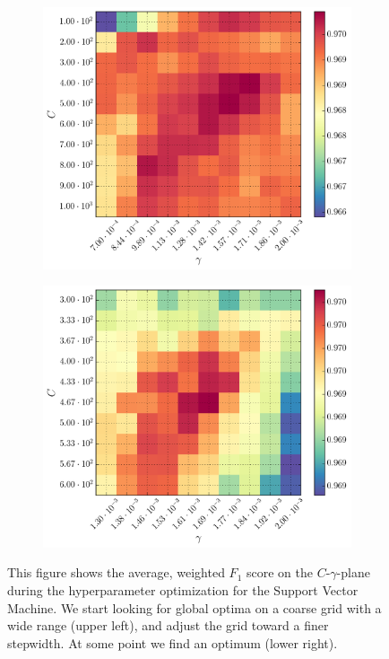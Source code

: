 \begin{figure}[h]
\begin{subfigure}[t]{0.49\textwidth}
	\end{subfigure}
	\begin{subfigure}[t]{0.49\textwidth}
		\centering
		\includegraphics[width=\textwidth]{figures/gridsearch/svm/superclasses/svm-superclasses-05.png}				
	\end{subfigure}
	\begin{subfigure}[t]{0.49\textwidth}
		\centering
		\includegraphics[width=\textwidth]{figures/gridsearch/svm/superclasses/svm-superclasses-06.png}		
	\end{subfigure}
	\caption[Hyperparameter optimization for the Support Vector Machine (SVM)]{This figure shows the average, weighted $F_1$ score on the $C$-$\gamma$-plane during the hyperparameter optimization for the Support Vector Machine. We start looking for global optima on a coarse grid with a wide range (upper left), and adjust the grid toward a finer stepwidth. At some point we find an optimum (lower right).}
	\label{fig:gridsearch-svm-superclasses}
\end{figure}

